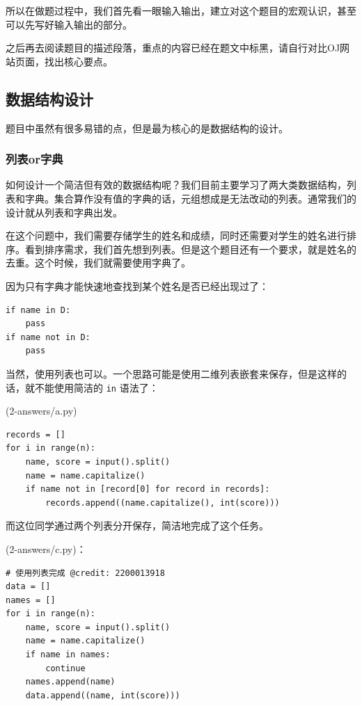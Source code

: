 \documentclass{article}
\begin{document}
所以在做题过程中，我们首先看一眼输入输出，建立对这个题目的宏观认识，甚至可以先写好输入输出的部分。

之后再去阅读题目的描述段落，重点的内容已经在题文中标黑，请自行对比OJ网站页面，找出核心要点。

\subsection{数据结构设计}

题目中虽然有很多易错的点，但是最为核心的是数据结构的设计。

\subsubsection{列表or字典}


如何设计一个简洁但有效的数据结构呢？我们目前主要学习了两大类数据结构，列表和字典。集合算作没有值的字典的话，元组想成是无法改动的列表。通常我们的设计就从列表和字典出发。

在这个问题中，我们需要存储学生的姓名和成绩，同时还需要对学生的姓名进行排序。看到排序需求，我们首先想到列表。但是这个题目还有一个要求，就是姓名的去重。这个时候，我们就需要使用字典了。

因为只有字典才能快速地查找到某个姓名是否已经出现过了：
\begin{lstlisting}
if name in D:
    pass
if name not in D:
    pass
\end{lstlisting}

当然，使用列表也可以。一个思路可能是使用二维列表嵌套来保存，但是这样的话，就不能使用简洁的 \lstinline|in| 语法了：

(2-answers/a.py)
\begin{lstlisting}
records = []
for i in range(n):
    name, score = input().split()
    name = name.capitalize()
    if name not in [record[0] for record in records]:
        records.append((name.capitalize(), int(score)))
\end{lstlisting}

而这位同学通过两个列表分开保存，简洁地完成了这个任务。

(2-answers/c.py)：
\begin{lstlisting}
# 使用列表完成 @credit: 2200013918
data = []
names = []
for i in range(n):
    name, score = input().split()
    name = name.capitalize()
    if name in names:
        continue
    names.append(name)
    data.append((name, int(score)))
\end{lstlisting}
\end{document}
